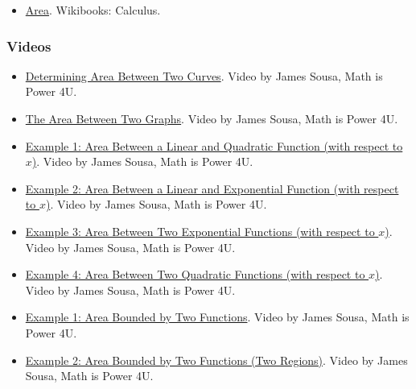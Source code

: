 \begin{itemize}
\item \href{https://en.wikibooks.org/wiki/Calculus/Area}{Area}.  
Wikibooks: Calculus.
\end{itemize}

\subsubsection{Videos}
\label{sss:vide-cce3}

\begin{itemize}

\item \href{https://www.youtube.com/watch?v=de-0e0nYf5I}{Determining Area Between Two Curves}.  
Video by James Sousa, Math is Power 4U.

\item \href{https://www.youtube.com/watch?v=E_1aDcOoDtE}{The Area Between Two Graphs}.  
Video by James Sousa, Math is Power 4U.

\item \href{https://www.youtube.com/watch?v=q7De3oOp4Ug}{Example 1: Area Between a Linear and Quadratic Function (with respect to $x$)}.  
Video by James Sousa, Math is Power 4U.

\item \href{https://www.youtube.com/watch?v=n2JqTztMrvQ}{Example 2: Area Between a Linear and Exponential Function (with respect to $x$)}.  
Video by James Sousa, Math is Power 4U.

\item \href{https://www.youtube.com/watch?v=OqMbRAEQ-cg}{Example 3: Area Between Two Exponential Functions (with respect to $x$)}.  
Video by James Sousa, Math is Power 4U.

\item \href{https://www.youtube.com/watch?v=58Esio4q4jk}{Example 4: Area Between Two Quadratic Functions (with respect to $x$)}.  
Video by James Sousa, Math is Power 4U.

\item \href{https://www.youtube.com/watch?v=CPhUolqwLNk}{Example 1: Area Bounded by Two Functions}.  
Video by James Sousa, Math is Power 4U.

\item \href{https://www.youtube.com/watch?v=lskEXsJaJV0}{Example 2: Area Bounded by Two Functions (Two Regions)}.  
Video by James Sousa, Math is Power 4U.


\end{itemize}
